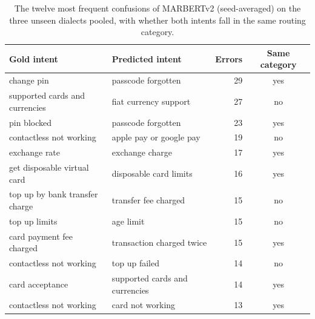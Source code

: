 \begin{table}[t]\centering\small\caption{The twelve most frequent confusions of MARBERTv2 (seed-averaged) on the three unseen dialects pooled, with whether both intents fall in the same routing category.}\label{tab:confusions}
\begin{tabular}{llrc}\toprule
Gold intent & Predicted intent & Errors & Same category \\\midrule
change pin & passcode forgotten & 29 & yes \\
supported cards and currencies & fiat currency support & 27 & no \\
pin blocked & passcode forgotten & 23 & yes \\
contactless not working & apple pay or google pay & 19 & no \\
exchange rate & exchange charge & 17 & yes \\
get disposable virtual card & disposable card limits & 16 & yes \\
top up by bank transfer charge & transfer fee charged & 15 & no \\
top up limits & age limit & 15 & no \\
card payment fee charged & transaction charged twice & 15 & yes \\
contactless not working & top up failed & 14 & no \\
card acceptance & supported cards and currencies & 14 & yes \\
contactless not working & card not working & 13 & yes \\
\bottomrule\end{tabular}\end{table}
